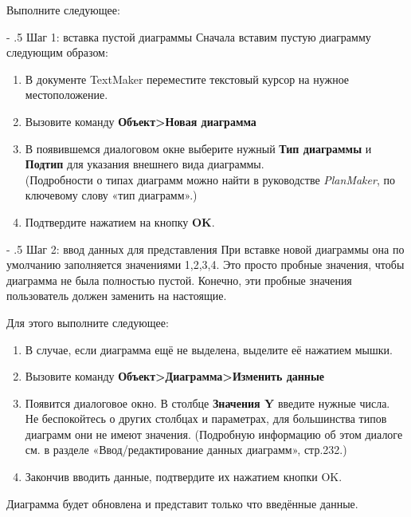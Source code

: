 ﻿\documentclass[a4paper,10pt]{article}
\makeatletter
\renewcommand\paragraph{%
   \@startsection{paragraph}{4}{0mm}%
      {-\baselineskip}%
      {.5\baselineskip}%
      {\normalfont\normalsize\bfseries}}
\makeatother
\begin{document}
 Выполните следующее:
 
 \paragraph{Шаг 1: вставка пустой диаграммы}
 Сначала вставим пустую диаграмму следующим образом:
 \begin{enumerate}
  \item В документе TextMaker переместите текстовый курсор на нужное местоположение.
  \item Вызовите команду \textbf{Объект>Новая диаграмма}
  \item В появившемся диалоговом окне выберите нужный \textbf{Тип диаграммы} и \textbf{Подтип} для указания внешнего вида диаграммы.\\
  (Подробности о типах диаграмм можно найти в руководстве \textit{PlanMaker}, по ключевому слову «тип диаграмм».)
  \item Подтвердите нажатием на кнопку \textbf{OK}.
 \end{enumerate}

 \paragraph{Шаг 2: ввод данных для представления}
 При вставке новой диаграммы она по умолчанию заполняется значениями 1,2,3,4. Это просто пробные значения, чтобы диаграмма не была полностью пустой. Конечно, эти пробные значения пользователь должен заменить на настоящие.
 
 Для этого выполните следующее:
 
 \begin{enumerate}
  \item В случае, если диаграмма ещё не выделена, выделите её нажатием мышки.
  \item Вызовите команду \textbf{Объект>Диаграмма>Изменить данные}
  \item Появится диалоговое окно. В столбце \textbf{Значения Y} введите нужные числа.\\
  Не беспокойтесь о других столбцах и параметрах, для большинства типов диаграмм они не имеют значения. (Подробную информацию об этом диалоге см. в разделе «Ввод/редактирование данных диаграмм», стр.232.)
  \item Закончив вводить данные, подтвердите их нажатием кнопки OK.
 \end{enumerate}

 Диаграмма будет обновлена и представит только что введённые данные.
 
\end{document}
